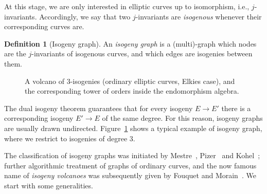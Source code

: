 \documentclass[10pt]{article}
\theoremstyle{plain}
\theoremstyle{definition}
\newtheorem{definition}[theorem]{Definition}
\DeclareMathOperator{\End}{End} %
\def\O{\ensuremath{\mathcal{O}}}
\begin{document}
At this stage, we are only interested in elliptic curves up to
isomorphism, i.e., $j$-invariants. %
Accordingly, we say that two $j$-invariants are \emph{isogenous}
whenever their corresponding curves are. %

\begin{definition}[Isogeny graph]
  An \emph{isogeny graph} is a (multi)-graph which nodes are the
  $j$-invariants of isogenous curves, and which edges are isogenies
  between them.
\end{definition}


\begin{figure}
  \centering
  
    \caption{A volcano of $3$-isogenies (ordinary elliptic curves,
      Elkies case), and the corresponding tower of orders inside the
      endomorphism algebra.}
  \label{fig:volcano}
\end{figure}

The dual isogeny theorem guarantees that for every isogeny $E\to E'$
there is a corresponding isogeny $E'\to E$ of the same degree. %
For this reason, isogeny graphs are usually drawn undirected. %
Figure~\ref{fig:volcano} shows a typical example of isogeny graph,
where we restrict to isogenies of degree $3$.

The classification of isogeny graphs was initiated by
Mestre~\cite{Mestre}, Pizer~\cite{pizer1,pizer2} and
Kohel~\cite{kohel}; further algorithmic treatment of graphs of
ordinary curves, and the now famous name of \emph{isogeny volcanoes}
was subsequently given by Fouquet and
Morain~\cite{fouquet+morain02}. %
We start with some generalities.
\end{document}
